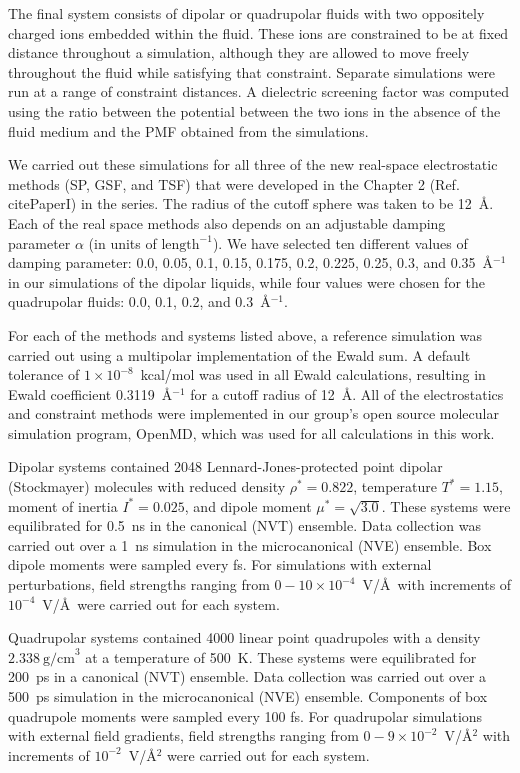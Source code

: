 The final system consists of dipolar or quadrupolar fluids with two
oppositely charged ions embedded within the fluid. These ions are
constrained to be at fixed distance throughout a simulation, although
they are allowed to move freely throughout the fluid while satisfying
that constraint. Separate simulations were run at a range of
constraint distances. A dielectric screening factor was computed using
the ratio between the potential between the two ions in the absence of
the fluid medium and the PMF obtained from the simulations.

We carried out these simulations for all three of the new real-space
electrostatic methods (SP, GSF, and TSF) that were developed in the
Chapter 2 (Ref. cite{PaperI}) in the series. The radius of
the cutoff sphere was taken to be 12~\AA. Each of the real space
methods also depends on an adjustable damping parameter $\alpha$ (in
units of $\mathrm{length}^{-1}$).  We have selected ten different
values of damping parameter: 0.0, 0.05, 0.1, 0.15, 0.175, 0.2, 0.225,
0.25, 0.3, and 0.35~\AA$^{-1}$ in our simulations of the dipolar
liquids, while four values were chosen for the quadrupolar fluids:
0.0, 0.1, 0.2, and 0.3~\AA$^{-1}$.

For each of the methods and systems listed above, a reference
simulation was carried out using a multipolar implementation of the
Ewald sum.\cite{Smith82,Smith98} A default tolerance of
$1 \times 10^{-8}$~kcal/mol was used in all Ewald calculations,
resulting in Ewald coefficient 0.3119~\AA$^{-1}$ for a cutoff radius
of 12~\AA.  All of the electrostatics and constraint methods were
implemented in our group's open source molecular simulation program,
OpenMD,\cite{Meineke05, openmd} which was used for all calculations in
this work.

Dipolar systems contained 2048 Lennard-Jones-protected point dipolar
(Stockmayer) molecules with reduced density $\rho^* = 0.822$,
temperature $T^* = 1.15$, moment of inertia $I^* = 0.025$, and dipole
moment $\mu^* = \sqrt{3.0}$.  These systems were equilibrated for
0.5~ns in the canonical (NVT) ensemble.  Data collection was carried
out over a 1~ns simulation in the microcanonical (NVE) ensemble.  Box
dipole moments were sampled every fs.  For simulations with external
perturbations, field strengths ranging from $0 - 10 \times
10^{-4}$~V/\AA\ with increments of $ 10^{-4}$~V/\AA\ were carried out
for each system. 

Quadrupolar systems contained 4000 linear point quadrupoles with a
density $2.338 \mathrm{~g/cm}^3$ at a temperature of 500~K. These
systems were equilibrated for 200~ps in a canonical (NVT) ensemble.
Data collection was carried out over a 500~ps simulation in the
microcanonical (NVE) ensemble. Components of box quadrupole moments
were sampled every 100 fs. For quadrupolar simulations with external
field gradients, field strengths ranging from
$0 - 9 \times 10^{-2}$~V/\AA$^2$ with increments of
$10^{-2}$~V/\AA$^2$ were carried out for each system.

